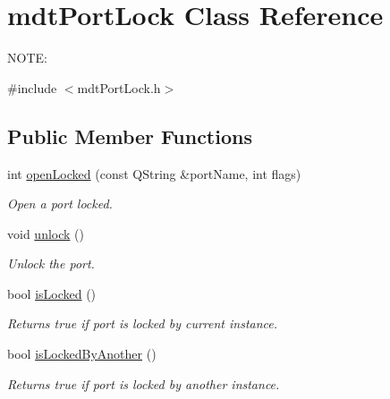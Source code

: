\hypertarget{classmdt_port_lock}{
\section{mdtPortLock Class Reference}
\label{classmdt_port_lock}
}


NOTE:  




{\ttfamily \#include $<$mdtPortLock.h$>$}

\subsection*{Public Member Functions}
\begin{DoxyCompactItemize}
\item 
int \hyperlink{classmdt_port_lock_a25e9a2cb8a10069fae75c76b6809c27f}{openLocked} (const QString \&portName, int flags)
\begin{DoxyCompactList}\small\item\em Open a port locked. \end{DoxyCompactList}\item 
void \hyperlink{classmdt_port_lock_a60b65f02d57568dc36c5e918aa5357a6}{unlock} ()
\begin{DoxyCompactList}\small\item\em Unlock the port. \end{DoxyCompactList}\item 
\hypertarget{classmdt_port_lock_a07a7d13509147d65dde89e95ac343eb2}{
bool \hyperlink{classmdt_port_lock_a07a7d13509147d65dde89e95ac343eb2}{isLocked} ()}
\label{classmdt_port_lock_a07a7d13509147d65dde89e95ac343eb2}

\begin{DoxyCompactList}\small\item\em Returns true if port is locked by current instance. \end{DoxyCompactList}\item 
\hypertarget{classmdt_port_lock_a739a8cedebb1a32e122c7e451f0cfe98}{
bool \hyperlink{classmdt_port_lock_a739a8cedebb1a32e122c7e451f0cfe98}{isLockedByAnother} ()}
\label{classmdt_port_lock_a739a8cedebb1a32e122c7e451f0cfe98}

\begin{DoxyCompactList}\small\item\em Returns true if port is locked by another instance. \end{DoxyCompactList}\end{DoxyCompactItemize}


